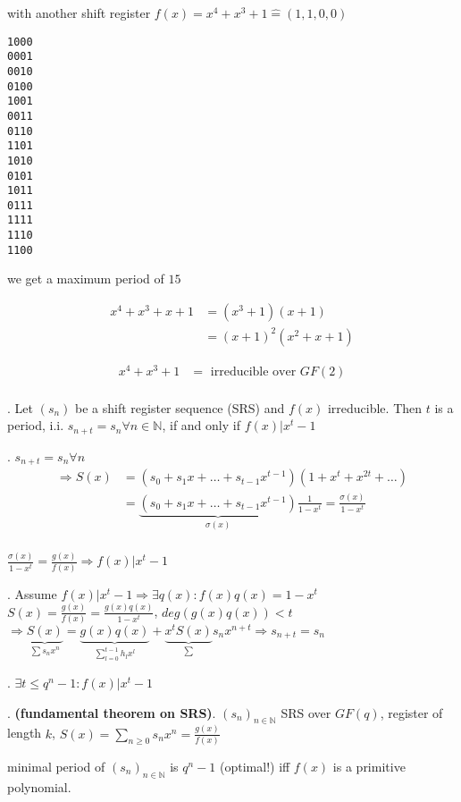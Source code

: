 with another shift register $f(x) = x^4 + x^3 + 1 \hat{=} (1,1,0,0)$
\begin{verbatim}
1000
0001
0010
0100
1001
0011
0110
1101
1010
0101
1011
0111
1111
1110
1100
\end{verbatim}

we get a maximum period of $15$

\begin{align*}
  x^4 + x^3 + x + 1 &= (x^3 + 1)(x+1)\\
    &= (x+1)^2(x^2+x+1)
\end{align*}

\begin{align*}
  x^4 + x^3 + 1 &= \text{ irreducible over $GF(2)$}\\
\end{align*}

\Theorem.
Let $(s_n)$ be a shift register sequence (SRS) and $f(x)$ irreducible. Then $t$ is a period, i.i. $s_{n+t}= s_n \forall n \in \mathbb{N}$, if and only if $f(x) | x^t-1$

\ProofForward.
$s_{n+t}= s_n \forall n$\\
\begin{align*}
  \Rightarrow S(x) &= (s_0+s_1x+ \ldots + s_{t-1}x^{t-1})(1+x^t+x^{2t}+\ldots)\\
                   &= \underbrace{(s_0+s_1x+ \ldots + s_{t-1}x^{t-1})}_{\sigma(x)} \frac{1}{1-x^t} = \frac{\sigma(x)}{1-x^t}\\
\end{align*}

$\frac{\sigma(x)}{1-x^t} = \frac{g(x)}{f(x)} \Rightarrow f(x) | x^t-1$

\ProofBackward.
Assume $f(x) | x^t-1 \Rightarrow \exists q(x): f(x)q(x) = 1-x^t$\\
$S(x) = \frac{g(x)}{f(x)} = \frac{g(x)q(x)}{1-x^t}$, $deg(g(x)q(x))<t$\\
$\Rightarrow \underbrace{S(x)}_{\sum s_n x^n} = \underbrace{g(x)q(x)}_{\sum_{l=0}^{t-1}h_lx^l} + \underbrace{x^t S(x)}_\sum s_n x^{n+t} \Rightarrow s_{n+t}= s_n$

\Corollary.
$\exists t \leq q^n -1: f(x) | x^t-1$

\Theorem. 
\textbf{(fundamental theorem on SRS)}.
$(s_n)_{n\in \mathbb{N}}$ SRS over $GF(q)$, register of length $k$, $S(x) = \sum_{n \geq 0} s_n x^n = \frac{g(x)}{f(x)}$

minimal period of $(s_n)_{n\in \mathbb{N}}$ is $q^n -1$ (optimal!) iff $f(x)$ is a primitive polynomial.

